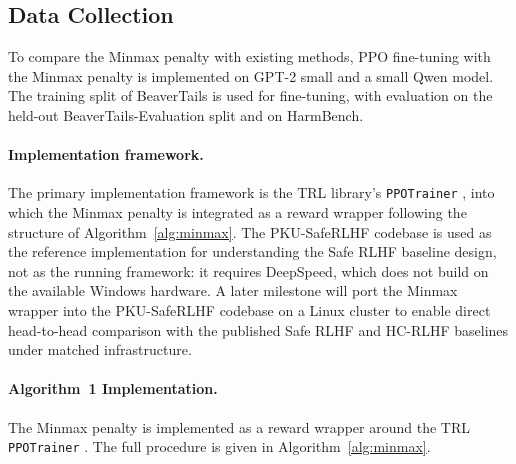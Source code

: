 \documentclass[a4paper,twoside,12pt]{report}
\begin{document}
\subsection{Data Collection}
\label{sec:data-collection}

To compare the Minmax penalty with existing methods, PPO fine-tuning with the Minmax
penalty is implemented on GPT-2 small and a small Qwen model. The training split of
BeaverTails is used for fine-tuning, with evaluation on the held-out BeaverTails-Evaluation
split and on HarmBench.

\paragraph{Implementation framework.}
The primary implementation framework is the TRL library's \texttt{PPOTrainer}
\citep{vonwerra2022trl}, into which the Minmax penalty is integrated as a reward
wrapper following the structure of Algorithm~\ref{alg:minmax}. The PKU-SafeRLHF
codebase \citep{ji2024pkusaferlhf} is used as the reference implementation for
understanding the Safe RLHF baseline design, not as the running framework: it
requires DeepSpeed, which does not build on the available Windows hardware. A
later milestone will port the Minmax wrapper into the PKU-SafeRLHF codebase on a
Linux cluster to enable direct head-to-head comparison with the published Safe RLHF
and HC-RLHF baselines under matched infrastructure.

\paragraph{Algorithm~1 Implementation.}
The Minmax penalty is implemented as a reward wrapper around the TRL
\texttt{PPOTrainer} \citep{vonwerra2022trl}. The full procedure is given in
Algorithm~\ref{alg:minmax}.
\end{document}

